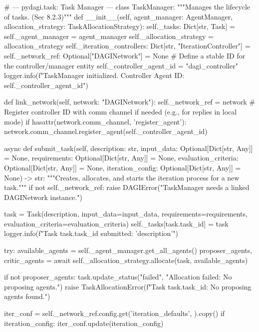 \documentclass{amsbook}
\theoremstyle{definition}
\theoremstyle{remark}
\numberwithin{equation}{chapter} %
\begin{document}
\begin{python}
# --- pydagi.task: Task Manager ---
class TaskManager:
    """Manages the lifecycle of tasks. (Sec 8.2.3)"""
    def __init__(self, agent_manager: AgentManager, allocation_strategy: TaskAllocationStrategy):
        self._tasks: Dict[str, Task] = {}
        self._agent_manager = agent_manager
        self._allocation_strategy = allocation_strategy
        self._iteration_controllers: Dict[str, "IterationController"] = {}
        self._network_ref: Optional["DAGINetwork"] = None
        # Define a stable ID for the controller/manager entity
        self._controller_agent_id = "dagi_controller"
        logger.info(f"TaskManager initialized. Controller Agent ID: {self._controller_agent_id}")

    def link_network(self, network: "DAGINetwork"):
         self._network_ref = network
         # Register controller ID with comm channel if needed (e.g., for replies in local mode)
         if hasattr(network.comm_channel, 'register_agent'):
              network.comm_channel.register_agent(self._controller_agent_id)

    async def submit_task(self,
                          description: str,
                          input_data: Optional[Dict[str, Any]] = None,
                          requirements: Optional[Dict[str, Any]] = None,
                          evaluation_criteria: Optional[Dict[str, Any]] = None,
                          iteration_config: Optional[Dict[str, Any]] = None) -> str:
        """Creates, allocates, and starts the iteration process for a new task."""
        if not self._network_ref:
             raise DAGIError("TaskManager needs a linked DAGINetwork instance.")

        task = Task(description, input_data=input_data, requirements=requirements, evaluation_criteria=evaluation_criteria)
        self._tasks[task.task_id] = task
        logger.info(f"Task {task.task_id} submitted: '{description}'")

        try:
            available_agents = self._agent_manager.get_all_agents()
            proposer_agents, critic_agents = await self._allocation_strategy.allocate(task, available_agents)

            if not proposer_agents:
                 task.update_status("failed", "Allocation failed: No proposing agents.")
                 raise TaskAllocationError(f"Task {task.task_id}: No proposing agents found.")

            iter_conf = self._network_ref.config.get('iteration_defaults', {}).copy()
            if iteration_config: iter_conf.update(iteration_config)


\end{python}
\end{document}
